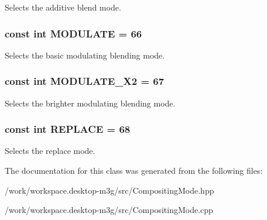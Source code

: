 Selects the additive blend mode. \hypertarget{classm3g_1_1CompositingMode_96b64c2847348fb73a90c4a501cda9d1}{
\subsubsection[{MODULATE}]{\setlength{\rightskip}{0pt plus 5cm}const int {\bf MODULATE} = 66}}
\label{classm3g_1_1CompositingMode_96b64c2847348fb73a90c4a501cda9d1}


Selects the basic modulating blending mode. \hypertarget{classm3g_1_1CompositingMode_cb426684e42a5ae425989c65fbb7dbc4}{
\subsubsection[{MODULATE\_\-X2}]{\setlength{\rightskip}{0pt plus 5cm}const int {\bf MODULATE\_\-X2} = 67}}
\label{classm3g_1_1CompositingMode_cb426684e42a5ae425989c65fbb7dbc4}


Selects the brighter modulating blending mode. \hypertarget{classm3g_1_1CompositingMode_47a00ac5a59817a48db06fb2a538883c}{
\subsubsection[{REPLACE}]{\setlength{\rightskip}{0pt plus 5cm}const int {\bf REPLACE} = 68}}
\label{classm3g_1_1CompositingMode_47a00ac5a59817a48db06fb2a538883c}


Selects the replace mode. 

The documentation for this class was generated from the following files:\begin{CompactItemize}
\item 
/work/workspace.desktop-m3g/src/CompositingMode.hpp\item 
/work/workspace.desktop-m3g/src/CompositingMode.cpp\end{CompactItemize}
